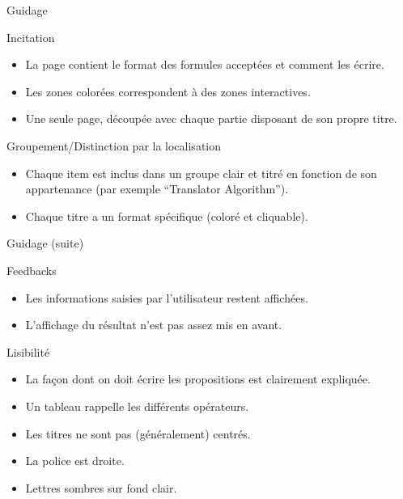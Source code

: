 \begin{frame}{Guidage}

  \begin{block}{Incitation}
    \begin{itemize}
    \item<pro@1-> La page contient le format des formules acceptées et
      comment les écrire.
    \item<pro@1-> Les zones colorées correspondent à des zones
      interactives.
    \item Une seule page, découpée avec chaque partie disposant de son
      propre titre.
    \end{itemize}
  \end{block}

  \begin{block}{Groupement/Distinction par la localisation}
    \begin{itemize}
    \item<pro@1-> Chaque item est inclus dans un groupe clair et titré en
      fonction de son appartenance (par exemple ``Translator
      Algorithm'').
    \item<pro@1-> Chaque titre a un format spécifique (coloré et
      cliquable).
    \end{itemize}
  \end{block}
\end{frame}

\begin{frame}{Guidage (suite)}
  \begin{block}{Feedbacks}
    \begin{itemize}
    \item Les informations saisies par l'utilisateur restent affichées.
    \item<con@1-> L'affichage du résultat n'est pas assez mis en avant.
    \end{itemize}
  \end{block}

  \begin{block}{Lisibilité}
    \begin{itemize}
    \item<pro@1-> La façon dont on doit écrire les propositions est
      clairement expliquée.
    \item Un tableau rappelle les différents opérateurs.
    \item Les titres ne sont pas (généralement) centrés.
    \item La police est droite.
    \item Lettres sombres sur fond clair.
    \end{itemize}
  \end{block}
\end{frame}
